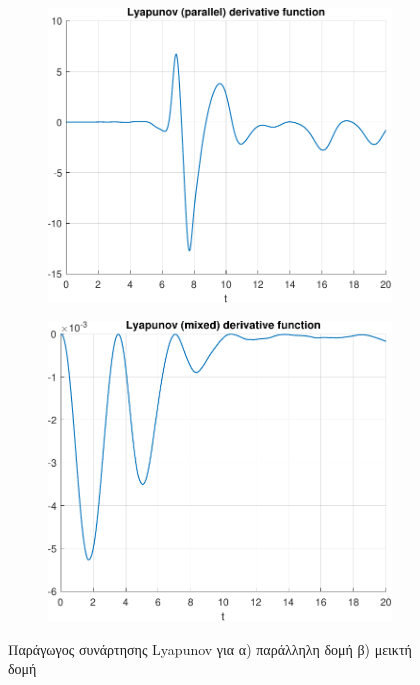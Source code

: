 \documentclass[a4paper,12pt]{article}
\begin{document}
\begin{figure}[h!]
    \centering
    \begin{subfigure}{0.45\textwidth}
        \centering
        \includegraphics[width=\linewidth]{plot/task1_lyapunov_derivative_function_parallel.pdf}
        \caption{}
        \label{fig:task1_lyapunov_derivative_function_parallel}
    \end{subfigure}
    \hfill
    \begin{subfigure}{0.45\textwidth}
        \centering
        \includegraphics[width=\linewidth]{plot/task1_lyapunov_derivative_function_mixed.pdf}
        \caption{}
        \label{fig:task1_lyapunov_derivative_function_mixed}
    \end{subfigure}
    \caption{Παράγωγος συνάρτησης Lyapunov για 
    α) παράλληλη δομή β) μεικτή δομή}
    \label{fig:task1_lyapunov_derivative_function}
\end{figure}
\end{document}
